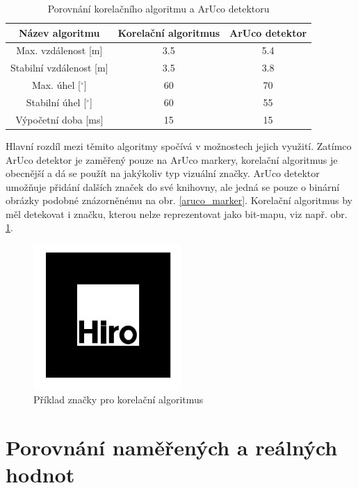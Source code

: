 \documentclass[twoside]{ctuthesis}
\theoremstyle{plain}
\theoremstyle{definition}
\theoremstyle{note}
\begin{document}
\begin{table}[hbt]
	\centering
	\caption{Porovnání korelačního algoritmu a ArUco detektoru}
	\label{porovnani}
	\begin{tabular}{|c|c|c|}
		\hline
		Název algoritmu              & Korelační algoritmus & ArUco detektor \\ \hline
		Max. vzdálenost {[}m{]}      & 3.5                 & 5.4           \\ \hline
		Stabilní vzdálenost {[}m{]}  & 3.5                 & 3.8           \\ \hline
		Max. úhel {[}$^\circ${]}     & 60                   & 70             \\ \hline
		Stabilní úhel {[}$^\circ${]} & 60                   & 55             \\ \hline
		Výpočetní doba {[}ms{]}      & 15                   & 15             \\ \hline
	\end{tabular}
\end{table}
Hlavní rozdíl mezi těmito algoritmy spočívá v možnostech jejich využití. Zatímco ArUco detektor je zaměřený pouze na ArUco markery, korelační algoritmus je obecnější a dá se použít na jakýkoliv typ vizuální značky. ArUco detektor umožňuje přidání dalších značek do své knihovny, ale jedná se pouze o binární obrázky podobné znázorněnému na obr. \ref{aruco_marker}. Korelační algoritmus by měl detekovat i značku, kterou nelze reprezentovat jako bit-mapu, viz např. obr. \ref{hiro}.


\begin{figure}[H]
	\caption{Příklad značky pro korelační algoritmus}

	\label{hiro}
	\includegraphics[width=0.5\textwidth]{images/5/r1301.jpg}
\end{figure}

\section{Porovnání naměřených a reálných hodnot}
\end{document}
